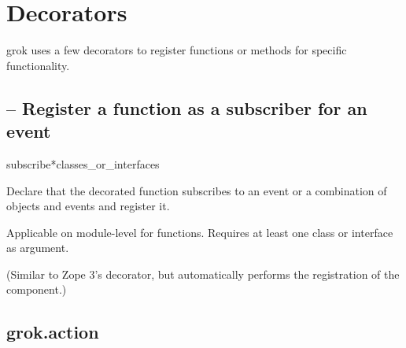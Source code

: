 \chapter{Decorators}

grok uses a few decorators to register functions or methods for specific
functionality.

    \section{ -- Register a function as a subscriber
    for an event}


        \begin{funcdesc}{subscribe}{*classes_or_interfaces}

        Declare that the decorated function subscribes to an event or a
        combination of objects and events and register it.
        

        Applicable on module-level for functions. Requires at least one class
        or interface as argument.

        (Similar to Zope 3's  decorator, but automatically
        performs the registration of the component.)
        \end{funcdesc}


    \section{grok.action}


